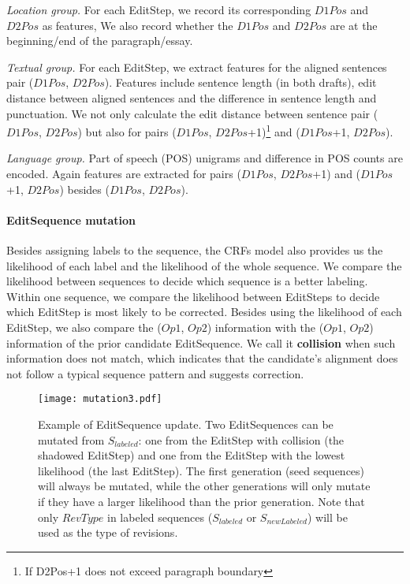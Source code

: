 \documentclass[11pt]{article}
\begin{document}
\textit{Location group.} For each EditStep, we record its corresponding $D1Pos$ and $D2Pos$ as features, We also record whether the $D1Pos$ and $D2Pos$ are at the beginning/end of the paragraph/essay.

\textit{Textual group.} For each EditStep, we extract features for the aligned sentences pair ($D1Pos$, $D2Pos$). Features include sentence length (in both drafts), edit distance between aligned sentences and the difference in sentence length and punctuation. We not only calculate the edit distance between sentence pair ($D1Pos$, $D2Pos$) but also for pairs ($D1Pos$, $D2Pos$+1)\footnote{If D2Pos+1 does not exceed paragraph boundary} and ($D1Pos$+1, $D2Pos$).   

\textit{Language group.} Part of speech (POS) unigrams and difference in POS counts are encoded. Again features are extracted for pairs ($D1Pos$, $D2Pos$+1) and ($D1Pos$+1, $D2Pos$) besides ($D1Pos$, $D2Pos$).   

\paragraph{EditSequence mutation}
Besides assigning labels to the sequence, the CRFs model also provides us the likelihood of each label and the likelihood of the whole sequence. We compare the likelihood between sequences to decide which sequence is a better labeling. Within one sequence, we compare the likelihood between EditSteps to decide which EditStep is most likely to be corrected. Besides using the likelihood of each EditStep, we also compare the ($Op1$, $Op2$) information with the ($Op1$, $Op2$) information of the prior candidate EditSequence. We call it \textbf{collision} when such information does not match, which indicates that the candidate's alignment does not follow a typical sequence pattern and suggests correction. 

\begin{figure*}
\centering
\texttt{[image: mutation3.pdf]}
\caption{Example of EditSequence update. Two EditSequences can be mutated from $S_{labeled}$: one from the EditStep with collision (the shadowed EditStep) and one from the EditStep with the lowest likelihood (the last EditStep). The first generation (seed sequences) will always be mutated, while the other generations will only mutate if they have a larger likelihood than the prior generation. Note that only $RevType$ in labeled sequences ($S_{labeled}$ or $S_{newLabeled}$)  will be used as the type of revisions.}
\label{figure:mutation}
\end{figure*}
\end{document}
